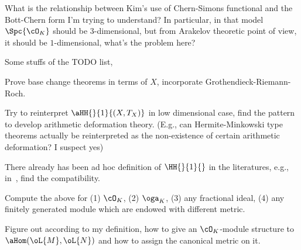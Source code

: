 \documentclass[article, a4paper, twoside]{universal}
\begin{document}
 What is the relationship between Kim's use of Chern-Simons functional and the Bott-Chern form I'm trying to understand? In particular, in that model $\Spc{\cO_{K}}$ should be $3$-dimensional, but from Arakelov theoretic point of view, it should be $1$-dimensional, what's the problem here?

\begin{rmk}
	Some stuffs of the TODO list,
	\begin{enr}
		\item Prove base change theorems in terms of $X$, incorporate Grothendieck-Riemann-Roch.
		\item Try to reinterpret $\aHH{}{1}{(X,T_{X})}$ in low dimensional case, find the pattern to develop arithmetic deformation theory. (E.g., can Hermite-Minkowski type theorems actually be reinterpreted as the non-existence of certain arithmetic deformation? I suspect yes)
		\item There already has been ad hoc definition of $\HH{}{1}{}$ in the literatures, e.g., in~\cite{Yuan2008Big,GS1991Lattice}, find the compatibility.
		\item Compute the above for (1) $\cO_{K}$, (2) $\oga_{K}$, (3) any fractional ideal, (4) any finitely generated module which are endowed with different metric.
		\item Figure out according to my definition, how to give an $\cO_{K}$-module structure to $\aHom(\oL{M},\oL{N})$ and how to assign the canonical metric on it.
	\end{enr}
\end{rmk}





\printref
\end{document}

